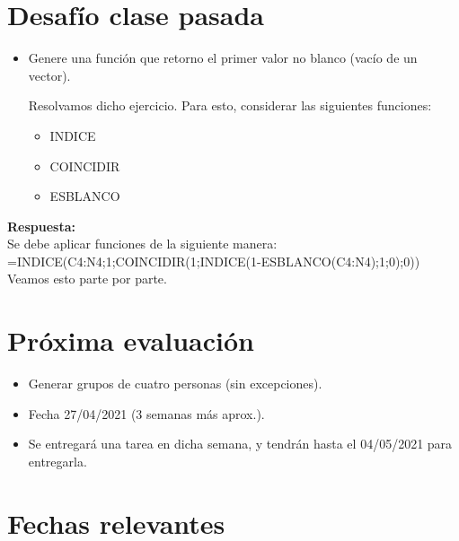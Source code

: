 \documentclass[12 pt,letterpaper]{article}
\newenvironment{solution}
{\begin{mdframed} \textbf{Respuesta:} \ \\}
	{\end{mdframed}}
\begin{document}
\section{Desafío clase pasada \faWarning}

\begin{itemize}
	\item Genere una función que retorno el primer valor no blanco (vacío de un vector). 
	
	Resolvamos dicho ejercicio. Para esto, considerar las siguientes funciones:
	
	\begin{itemize}
		\item INDICE
		\item COINCIDIR
		\item ESBLANCO
	\end{itemize}

\end{itemize}

\begin{solution}
	Se debe aplicar funciones de la siguiente manera:\\
	
	=INDICE(C4:N4;1;COINCIDIR(1;INDICE(1-ESBLANCO(C4:N4);1;0);0)) \\
	
	Veamos esto parte por parte.
\end{solution} 

\section{Próxima evaluación}

\begin{itemize}
	\item Generar grupos de cuatro personas (sin excepciones).
	
	\item Fecha 27/04/2021 (3 semanas más aprox.).
	
	\item Se entregará una tarea en dicha semana, y tendrán hasta el 04/05/2021 para entregarla. 
\end{itemize}

\section{Fechas relevantes}
\end{document}
